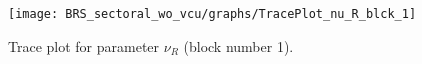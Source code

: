 \begin{figure}[H]
\centering
  \texttt{[image: BRS\_sectoral\_wo\_vcu/graphs/TracePlot\_nu\_R\_blck\_1]}\\
    \caption{Trace plot for parameter ${\nu_R}$ (block number 1).}
\end{figure}
